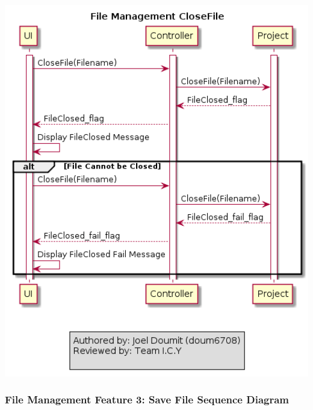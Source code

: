 \documentclass[twoside,letterpaper]{article}
\begin{document}
	\includegraphics[width=6.0in]{images/SequenceDiagrams/FM_FileClose_Image}
	
	\newpage
	
	\subsubsection[File Management Feature 3: Save File Sequence Diagram]{\rmfamily\bfseries\color{black}
		File Management Feature 3: Save File Sequence Diagram}
	\hypertarget{RefHeading22059017292}{}
	
\end{document}
